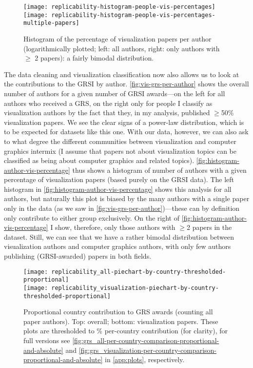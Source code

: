 \documentclass[conference,svgnames]{vgtc}                     %
\begin{document}
\begin{figure}
	\centering
	\texttt{[image: replicability-histogram-people-vis-percentages]}\hfill%
	\texttt{[image: replicability-histogram-people-vis-percentages-multiple-papers]}%
	\caption{Histogram of the percentage of visualization papers per author (logarithmically plotted; left: all authors, right: only authors with $\geq$ 2 papers): a fairly bimodal distribution.}
	\label{fig:histogram-author-vis-percentage}
\end{figure}

The data cleaning and visualization classification now also allows us to look at the contributions to the GRSI by author. \autoref{fig:vis-grs-per-author} shows the overall number of authors for a given number of GRSI awards---on the left for all authors who received a GRS, on the right only for people I classify as visualization authors by the fact that they, in my analysis, published $\geq$50\% visualization papers. We see the clear signs of a power-law distribution, which is to be expected for datasets like this one. With our data, however, we can also ask to what degree the different communities between visualization and computer graphics intermix (I assume that papers not about visualization topics can be classified as being about computer graphics and related topics). \autoref{fig:histogram-author-vis-percentage} thus shows a histogram of number of authors with a given percentage of visualization papers (based purely on the GRSI data). The left histogram in \autoref{fig:histogram-author-vis-percentage} shows this analysis for all authors, but naturally this plot is biased by the many authors with a single paper only in the data (as we saw in \autoref{fig:vis-grs-per-author})---these can by definition only contribute to either group exclusively. On the right of \autoref{fig:histogram-author-vis-percentage} I show, therefore, only those authors with $\geq$2 papers in the dataset. Still, we can see that we have a rather bimodal distribution between visualization authors and computer graphics authors, with only few authors publishing (GRSI-awarded) papers in both fields.

\begin{figure}
	\centering
	\texttt{[image: replicability\_all-piechart-by-country-thresholded-proportional]}\\[1ex]%
	\texttt{[image: replicability\_visualization-piechart-by-country-thresholded-proportional]}%
	\caption{Proportional country contribution to GRS awards (counting all paper authors). Top: overall; bottom: visualization papers. These plots are thresholded to \GrsiCountryPieChartThreshold\% per-country contribution (for clarity), for full versions see \autoref{fig:grs_all-per-country-comparison-proportional-and-absolute} and \autoref{fig:grs_visualization-per-country-comparison-proportional-and-absolute} in \autoref{app:plots}, respectively.}
	\label{fig:vis-grs-per-country-proportional}
\end{figure}
\end{document}
